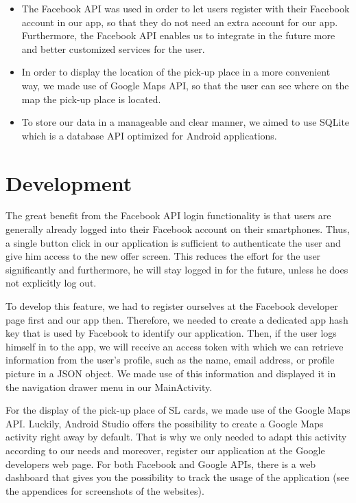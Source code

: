 \documentclass[11pt,twoside,a4paper]{report}
\begin{document}
\begin{itemize}
\item The Facebook API was used in order to let users register with their Facebook account in our app, so that they do not need an extra account for our app. Furthermore, the Facebook API enables us to integrate in the future more and better customized services for the user.
\item In order to display the location of the pick-up place in a more convenient way, we made use of Google Maps API, so that the user can see where on the map the pick-up place is located.
\item To store our data in a manageable and clear manner, we aimed to use SQLite which is a database API optimized for Android applications.
\end{itemize}

\section{Development}

The great benefit from the Facebook API login functionality is that users are generally already logged into their Facebook account on their smartphones. Thus, a single button click in our application is sufficient to authenticate the user and give him access to the new offer screen. This reduces the effort for the user significantly and furthermore, he will stay logged in for the future, unless he does not explicitly log out.

To develop this feature, we had to register ourselves at the Facebook developer page first and our app then. Therefore, we needed to create a dedicated app hash key that is used by Facebook to identify our application. Then, if the user logs himself in to the app, we will receive an access token with which we can retrieve information from the user's profile, such as the name, email address, or profile picture in a JSON object. We made use of this information and displayed it in the navigation drawer menu in our MainActivity.

For the display of the pick-up place of SL cards, we made use of the Google Maps API. Luckily, Android Studio offers the possibility to create a Google Maps activity right away by default. That is why we only needed to adapt this activity according to our needs and moreover, register our application at the Google developers web page. For both Facebook and Google APIs, there is a web dashboard that gives you the possibility to track the usage of the application (see the appendices for screenshots of the websites).
\end{document}

